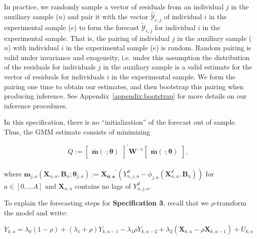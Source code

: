 \begin{enumerate}
\noindent In practice, we randomly sample a vector of residuals from an individual $j$ in the auxiliary sample ($n$) and pair it with the vector $\hat{\mathcal{Y}}_{e,j}$ of individual $i$ in the experimental sample ($e$) to form the forecast $\tilde{\mathcal{Y}}_{e,j}$ for individual $i$ in the experimental sample. That is, the pairing of individual $j$ in the auxiliary sample ($n$) with individual $i$ in the experimental sample ($e$) is random. Random pairing is valid under invariance and exogeneity, i.e. under this assumption the distribution of the residuals for individuals $j$ in the auxiliary sample is a valid estimate for the vector of residuals for individuals $i$ in the experimental sample. We form the pairing one time to obtain our estimates, and then bootstrap this pairing when producing inference. See Appendix~\ref{appendix:bootstrap} for more details on our inference procedures.
\end{enumerate}

\noindent In this specification, there is no ``initialization'' of the forecast out of sample. Thus, the GMM estimate consists of minimizing

\begin{equation}
Q :=  {\begin{bmatrix} {\bm{\bar{m}} \left( \cdot ; \bm{\theta} \right) }  \end{bmatrix}}^{'}
\bm{W} ^{-1}{\begin{bmatrix} {\bm{\bar{m}} \left( \cdot ; \bm{\theta} \right) }   \end{bmatrix}}, \label{eq:wlossspec2}
\end{equation}\\

\noindent where $\bm{m}_{j,a} \left( \bm{X}_{n,a}, \bm{B}_{n} ; \bm{\theta}_{j,a} \right) := {\bm{X_{n,a}}}^{'} \left( Y_{n,j,a}^d -   \phi_{j,a} \left( \bm{X}_{n,a}^d, \bm{B}_{n} \right) \right)$ for $a \in [0, \ldots A]$ and  $\bm{X}_{n,a}$ contains no lags of $Y_{n,j,a}^d$.

\noindent  To explain the forecasting steps for \textbf{Specification 3}, recall that we $\rho$-transform the model and write:

\begin{equation}
Y_{k,a} = \lambda_{0} \left( 1 - \rho \right) + \left( \lambda_{1} + \rho \right) Y_{k,a-1} - \lambda_{1} \rho Y_{k,a-2} + \lambda_{2} \left( \bm{X}_{k,a} - \rho \bm{X}_{k,a-1}  \right) + U_{k,a} \label{eq:rhotransform}
\end{equation}

